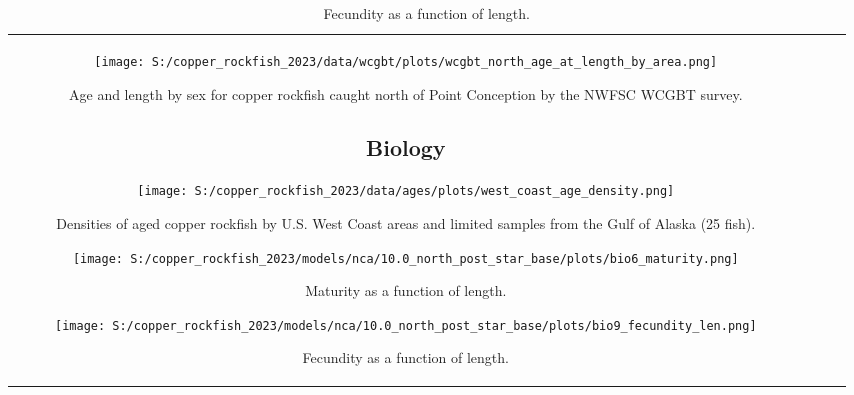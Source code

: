 \documentclass[11pt,
  letterpaper,
]{article}
\begin{document}
\begin{longtable}[t]{c>{\centering\arraybackslash}p{2cm}>{\centering\arraybackslash}p{2cm}>{\centering\arraybackslash}p{2cm}}
\begin{figure}
{\centering
\texttt{[image: S:/copper\_rockfish\_2023/data/wcgbt/plots/wcgbt\_north\_age\_at\_length\_by\_area.png]}
}
\caption{Age and length by sex for copper rockfish caught north of Point Conception by the NWFSC WCGBT survey.\label{fig:wcgbt-len-age}}
\end{figure}

\pagebreak

\subsection{Biology}\label{biology}

\begin{figure}
{\centering
\texttt{[image: S:/copper\_rockfish\_2023/data/ages/plots/west\_coast\_age\_density.png]}
}
\caption{Densities of aged copper rockfish by U.S. West Coast areas and limited samples from the Gulf of Alaska (25 fish).\label{fig:west-coast-age-density}}
\end{figure}

\pagebreak

\begin{figure}
{\centering
\texttt{[image: S:/copper\_rockfish\_2023/models/nca/10.0\_north\_post\_star\_base/plots/bio6\_maturity.png]}
}
\caption{Maturity as a function of length.\label{fig:maturity}}
\end{figure}

\pagebreak

\begin{figure}
{\centering
\texttt{[image: S:/copper\_rockfish\_2023/models/nca/10.0\_north\_post\_star\_base/plots/bio9\_fecundity\_len.png]}
}
\caption{Fecundity as a function of length.\label{fig:fecundity}}
\end{figure}


\end{longtable}
\end{document}
